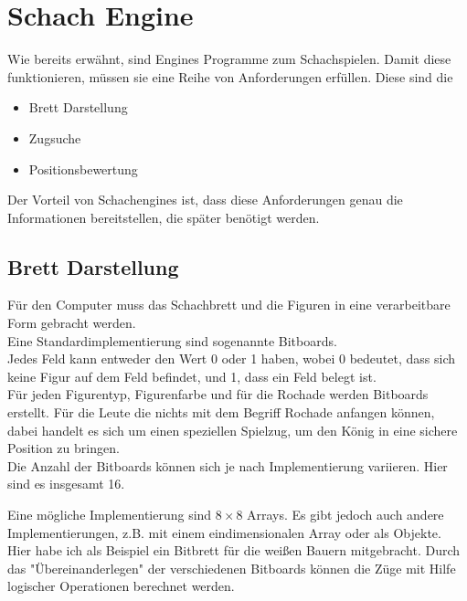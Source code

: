 \section{Schach Engine}

Wie bereits erwähnt, sind Engines Programme zum Schachspielen. Damit diese funktionieren, müssen sie eine Reihe von Anforderungen erfüllen. Diese sind die 
\begin{itemize}
\item Brett Darstellung
\item Zugsuche
\item Positionsbewertung
\end{itemize}
Der Vorteil von Schachengines ist, dass diese Anforderungen genau die Informationen bereitstellen, die später benötigt werden.

\newpage

\subsection{Brett Darstellung}

Für den Computer muss das Schachbrett und die Figuren in eine verarbeitbare Form gebracht werden.\\

Eine Standardimplementierung sind sogenannte Bitboards.\\

Jedes Feld kann entweder den Wert 0 oder 1 haben, wobei 0 bedeutet, dass sich keine Figur auf dem Feld befindet, und 1, dass ein Feld belegt ist.\\

Für jeden Figurentyp, Figurenfarbe und für die Rochade werden Bitboards erstellt. Für die Leute die nichts mit dem Begriff Rochade anfangen können, dabei handelt es sich um einen speziellen Spielzug, um den König in eine sichere Position zu bringen.\\

Die Anzahl der Bitboards können sich je nach Implementierung variieren. Hier sind es insgesamt 16.

\newpage

Eine mögliche Implementierung sind $8 \times 8$ Arrays. Es gibt jedoch auch andere Implementierungen, z.B. mit einem eindimensionalen Array oder als Objekte.\\

Hier habe ich als Beispiel ein Bitbrett für die weißen Bauern mitgebracht. Durch das "Übereinanderlegen" der verschiedenen Bitboards können die Züge mit Hilfe logischer Operationen berechnet werden.\\

